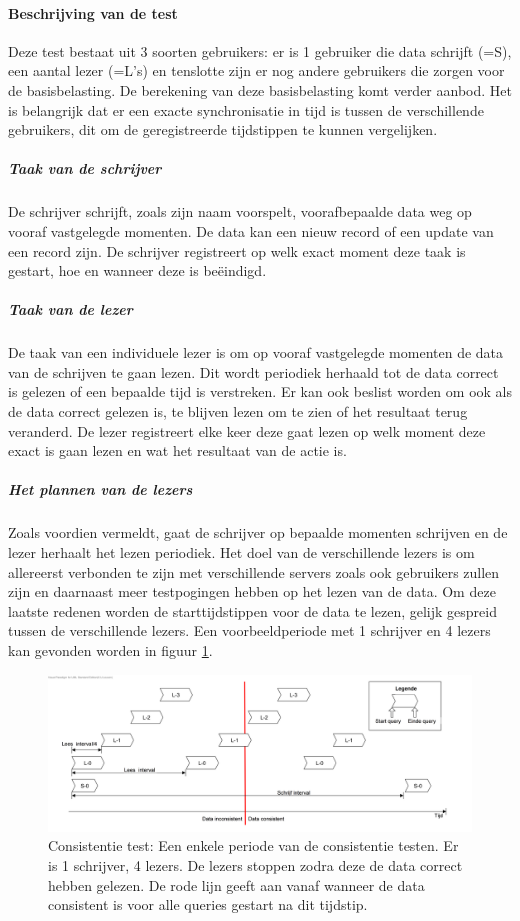 \paragraph{Beschrijving van de test} Deze test bestaat uit 3 soorten gebruikers: er is 1 gebruiker die data schrijft (=S), een aantal lezer (=L's) en tenslotte zijn er nog andere gebruikers die zorgen voor de basisbelasting. De berekening van deze basisbelasting komt verder aanbod.  
Het is belangrijk dat er een exacte synchronisatie in tijd is tussen de verschillende gebruikers, dit om de geregistreerde tijdstippen te kunnen vergelijken.


\subparagraph{Taak van de schrijver} De schrijver schrijft, zoals zijn naam voorspelt, voorafbepaalde data weg op vooraf vastgelegde momenten. De data kan een nieuw record of een update van een record zijn. De schrijver registreert op welk exact moment deze taak is gestart, hoe en wanneer deze is beëindigd.

\subparagraph{Taak van de lezer} De taak van een individuele lezer is om op vooraf vastgelegde momenten de data van de schrijven te gaan lezen. Dit wordt periodiek herhaald tot de data correct is gelezen of een bepaalde tijd is verstreken. Er kan ook beslist worden om ook als de data correct gelezen is, te blijven lezen om te zien of het resultaat terug veranderd. De lezer registreert elke keer deze gaat lezen op welk moment deze exact is gaan lezen en wat het resultaat van de actie is.  

\subparagraph{Het plannen van de lezers} Zoals voordien vermeldt, gaat de schrijver op bepaalde momenten schrijven en de lezer herhaalt het lezen periodiek. Het doel van de verschillende lezers is om allereerst verbonden te zijn met verschillende servers zoals ook gebruikers zullen zijn en daarnaast meer testpogingen hebben op het lezen van de data. Om deze laatste redenen worden de starttijdstippen voor de data te lezen, gelijk gespreid tussen de verschillende lezers. Een voorbeeldperiode met 1 schrijver en 4 lezers kan gevonden worden in figuur \ref{fig:test-consistentietest-periode}. 

\begin{figure}[ht!]
\centering
\includegraphics[width=\linewidth]{img/Consistentie-test-periode}
\caption{Consistentie test: Een enkele periode van de consistentie testen. Er is 1 schrijver, 4 lezers. De lezers stoppen zodra deze de data correct hebben gelezen. De rode lijn geeft aan vanaf wanneer de data consistent is voor alle queries gestart na dit tijdstip. }
\label{fig:test-consistentietest-periode}
\end{figure}


